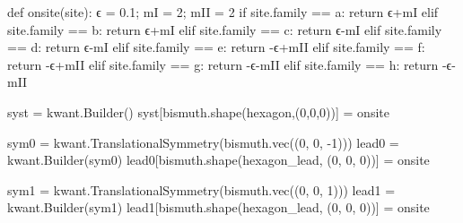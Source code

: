 \documentclass[
  letterpaper,
  DIV=11,
  numbers=noendperiod]{scrreprt}
\newenvironment{Shaded}{\begin{snugshade}}{\end{snugshade}}
\newcommand{\ControlFlowTok}[1]{\textcolor[rgb]{0.00,0.23,0.31}{#1}}
\newcommand{\DecValTok}[1]{\textcolor[rgb]{0.68,0.00,0.00}{#1}}
\newcommand{\FloatTok}[1]{\textcolor[rgb]{0.68,0.00,0.00}{#1}}
\newcommand{\KeywordTok}[1]{\textcolor[rgb]{0.00,0.23,0.31}{#1}}
\newcommand{\NormalTok}[1]{\textcolor[rgb]{0.00,0.23,0.31}{#1}}
\newcommand{\OperatorTok}[1]{\textcolor[rgb]{0.37,0.37,0.37}{#1}}
\begin{document}
\begin{Shaded}
\begin{Highlighting}[]
    \KeywordTok{def}\NormalTok{ onsite(site):}
\NormalTok{        ϵ }\OperatorTok{=} \FloatTok{0.1}\OperatorTok{;}\NormalTok{ mI  }\OperatorTok{=} \DecValTok{2}\OperatorTok{;}\NormalTok{ mII }\OperatorTok{=} \DecValTok{2}
        \ControlFlowTok{if}\NormalTok{ site.family   }\OperatorTok{==}\NormalTok{ a:}
            \ControlFlowTok{return}\NormalTok{ ϵ}\OperatorTok{+}\NormalTok{mI}
        \ControlFlowTok{elif}\NormalTok{ site.family }\OperatorTok{==}\NormalTok{ b:}
            \ControlFlowTok{return}\NormalTok{ ϵ}\OperatorTok{+}\NormalTok{mI}
        \ControlFlowTok{elif}\NormalTok{ site.family }\OperatorTok{==}\NormalTok{ c:}
            \ControlFlowTok{return}\NormalTok{ ϵ}\OperatorTok{{-}}\NormalTok{mI}
        \ControlFlowTok{elif}\NormalTok{ site.family }\OperatorTok{==}\NormalTok{ d:}
            \ControlFlowTok{return}\NormalTok{ ϵ}\OperatorTok{{-}}\NormalTok{mI}
        \ControlFlowTok{elif}\NormalTok{ site.family }\OperatorTok{==}\NormalTok{ e:}
            \ControlFlowTok{return} \OperatorTok{{-}}\NormalTok{ϵ}\OperatorTok{+}\NormalTok{mII  }
        \ControlFlowTok{elif}\NormalTok{ site.family }\OperatorTok{==}\NormalTok{ f:}
            \ControlFlowTok{return} \OperatorTok{{-}}\NormalTok{ϵ}\OperatorTok{+}\NormalTok{mII  }
        \ControlFlowTok{elif}\NormalTok{ site.family }\OperatorTok{==}\NormalTok{ g:}
            \ControlFlowTok{return} \OperatorTok{{-}}\NormalTok{ϵ}\OperatorTok{{-}}\NormalTok{mII  }
        \ControlFlowTok{elif}\NormalTok{ site.family }\OperatorTok{==}\NormalTok{ h:}
            \ControlFlowTok{return} \OperatorTok{{-}}\NormalTok{ϵ}\OperatorTok{{-}}\NormalTok{mII  }

\NormalTok{    syst }\OperatorTok{=}\NormalTok{ kwant.Builder()}
\NormalTok{    syst[bismuth.shape(hexagon,(}\DecValTok{0}\NormalTok{,}\DecValTok{0}\NormalTok{,}\DecValTok{0}\NormalTok{))] }\OperatorTok{=}\NormalTok{ onsite  }


\NormalTok{    sym0 }\OperatorTok{=}\NormalTok{ kwant.TranslationalSymmetry(bismuth.vec((}\DecValTok{0}\NormalTok{, }\DecValTok{0}\NormalTok{, }\OperatorTok{{-}}\DecValTok{1}\NormalTok{)))}
\NormalTok{    lead0 }\OperatorTok{=}\NormalTok{ kwant.Builder(sym0)}
\NormalTok{    lead0[bismuth.shape(hexagon\_lead, (}\DecValTok{0}\NormalTok{, }\DecValTok{0}\NormalTok{, }\DecValTok{0}\NormalTok{))] }\OperatorTok{=}\NormalTok{ onsite}

\NormalTok{    sym1 }\OperatorTok{=}\NormalTok{ kwant.TranslationalSymmetry(bismuth.vec((}\DecValTok{0}\NormalTok{, }\DecValTok{0}\NormalTok{, }\DecValTok{1}\NormalTok{)))}
\NormalTok{    lead1 }\OperatorTok{=}\NormalTok{ kwant.Builder(sym1)}
\NormalTok{    lead1[bismuth.shape(hexagon\_lead, (}\DecValTok{0}\NormalTok{, }\DecValTok{0}\NormalTok{, }\DecValTok{0}\NormalTok{))] }\OperatorTok{=}\NormalTok{ onsite}
    

\end{Highlighting}
\end{Shaded}
\end{document}
